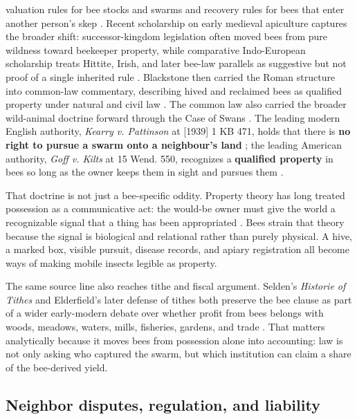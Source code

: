\documentclass[
  english,
]{article}
\begin{document}
valuation rules for bee stocks and swarms and recovery rules for bees
that enter another person's skep
\citep{bracton_bees_thorne, fleta1290_bees, welsh_laws1841_bees}. Recent
scholarship on early medieval apiculture captures the broader shift:
successor-kingdom legislation often moved bees from pure wildness toward
beekeeper property, while comparative Indo-European scholarship treats
Hittite, Irish, and later bee-law parallels as suggestive but not proof
of a single inherited rule
\citep{martinez_jimenez2022_apiculture_law, joseph2018_comparative_bee_law}.
Blackstone then carried the Roman structure into common-law commentary,
describing hived and reclaimed bees as qualified property under natural
and civil law \citep{blackstone1766_bees}. The common law also carried
the broader wild-animal doctrine forward through the Case of Swans
\citep{caseofswans1592}. The leading modern English authority,
\emph{Kearry v. Pattinson} at {[}1939{]} 1 KB 471, holds that there is
\textbf{no right to pursue a swarm onto a neighbour's land}
\citep{kearry1939}; the leading American authority, \emph{Goff v. Kilts}
at 15 Wend. 550, recognizes a \textbf{qualified property} in bees so
long as the owner keeps them in sight and pursues them \citep{goff1836}.

That doctrine is not just a bee-specific oddity. Property theory has
long treated possession as a communicative act: the would-be owner must
give the world a recognizable signal that a thing has been appropriated
\citep{rose1985possession_property}. Bees strain that theory because the
signal is biological and relational rather than purely physical. A hive,
a marked box, visible pursuit, disease records, and apiary registration
all become ways of making mobile insects legible as property.

The same source line also reaches tithe and fiscal argument. Selden's
\emph{Historie of Tithes} and Elderfield's later defense of tithes both
preserve the bee clause as part of a wider early-modern debate over
whether profit from bees belongs with woods, meadows, waters, mills,
fisheries, gardens, and trade
\citep{selden1618_tithes_bees, elderfield1650_tythes_bees}. That matters
analytically because it moves bees from possession alone into
accounting: law is not only asking who captured the swarm, but which
institution can claim a share of the bee-derived yield.

\subsection{Neighbor disputes, regulation, and
liability}\label{neighbor-disputes-regulation-and-liability}
\end{document}
